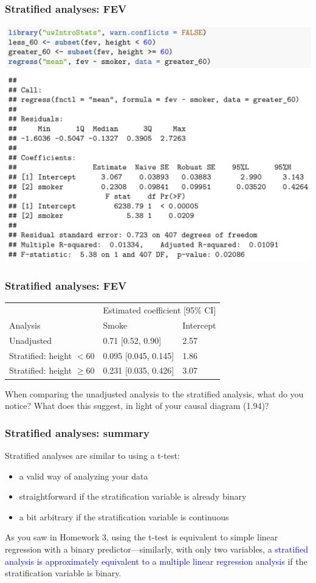 \documentclass[12pt, 
hyperref={colorlinks=true, linkcolor=blue, urlcolor=cyan},dvipsnames]{beamer}
\begin{document}
\begin{frame}
\frametitle{Stratified analyses: FEV}

\includegraphics[width=1\textwidth]{plots/fev_vs_smoke_stratified_greater_60.png}

\end{frame}

\begin{frame}
\frametitle{Stratified analyses: FEV}
\vspace{-1cm}\hspace*{-0.75cm}\begin{tabular}{lll}
& \multicolumn{2}{c}{Estimated coefficient [95\% CI]} \\
Analysis & Smoke & Intercept \\
\hline
Unadjusted  & 0.71 [0.52, 0.90] & 2.57 \\
Stratified: height $< 60$ & 0.095 [0.045, 0.145] & 1.86\\
Stratified: height $\geq 60$ & 0.231 [0.035, 0.426] & 3.07
\end{tabular}

\vspace{1cm}
When comparing the unadjusted analysis to the stratified analysis, what do you notice? What does this suggest, in light of your causal diagram (1.94)?
\end{frame}

\begin{frame}
\frametitle{Stratified analyses: summary}
Stratified analyses are similar to using a t-test:
\begin{itemize}
\item a valid way of analyzing your data
\item straightforward if the stratification variable is already binary
\item a bit arbitrary if the stratification variable is continuous
\end{itemize}

As you saw in Homework 3, using the t-test is equivalent to simple linear regression with a binary predictor---similarly, with only two variables, a \textcolor{blue}{stratified analysis is approximately equivalent to a multiple linear regression analysis} if the stratification variable is binary. 
\end{frame}
\end{document}
